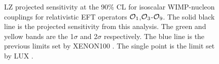 \begin{figure}[!htbp]
\caption{LZ projected sensitivity at the 90\% CL for isoscalar WIMP-nucleon couplings for relativistic EFT operators $\operatorname{\mathcal{O}}_1$,$\operatorname{\mathcal{O}}_3$-$\operatorname{\mathcal{O}}_9$.
         The solid black line is the projected sensitivity from this analysis. 
         The green and yellow bands are the 1$\sigma$ and 2$\sigma$ respectively.
         The blue line is the previous limits set by XENON100 \cite{xenon100_eft_ref}.
         The single point is the limit set by LUX \cite{LUX_RUN4_EFT_2021}.}
\label{fig:EFT_Result_Projected_Sensitivity_1}
\end{figure}




